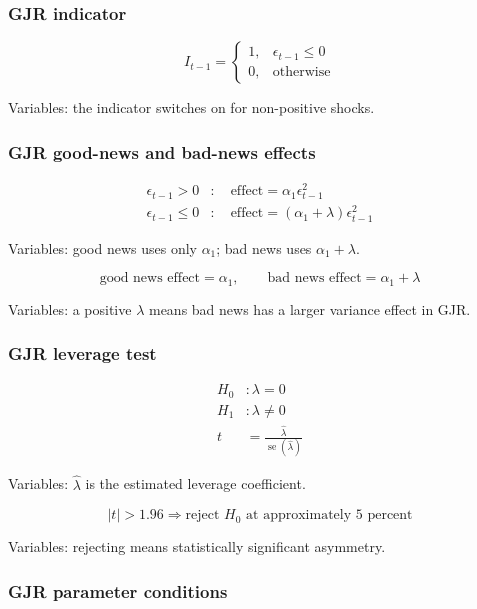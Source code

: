 \documentclass[
  8pt,
  twocolumn]{extarticle}
\begin{document}
\subsubsection{GJR indicator}\label{gjr-indicator}

\[
I_{t-1}=
\begin{cases}
1,&\epsilon_{t-1}\le0\\
0,&\text{otherwise}
\end{cases}
\]

Variables: the indicator switches on for non-positive shocks.

\subsubsection{GJR good-news and bad-news
effects}\label{gjr-good-news-and-bad-news-effects}

\[
\begin{aligned}
\epsilon_{t-1}>0&:\quad \text{effect}=\alpha_1\epsilon_{t-1}^2\\
\epsilon_{t-1}\le0&:\quad \text{effect}=(\alpha_1+\lambda)\epsilon_{t-1}^2
\end{aligned}
\]

Variables: good news uses only \(\alpha_1\); bad news uses
\(\alpha_1+\lambda\).

\[
\text{good news effect}=\alpha_1,\qquad \text{bad news effect}=\alpha_1+\lambda
\]

Variables: a positive \(\lambda\) means bad news has a larger variance
effect in GJR.

\subsubsection{GJR leverage test}\label{gjr-leverage-test}

\[
\begin{aligned}
H_0&:\lambda=0\\
H_1&:\lambda\ne0\\
t&=\frac{\hat\lambda}{\operatorname{se}(\hat\lambda)}
\end{aligned}
\]

Variables: \(\hat\lambda\) is the estimated leverage coefficient.

\[
|t|>1.96\Rightarrow \text{reject }H_0\text{ at approximately 5 percent}
\]

Variables: rejecting means statistically significant asymmetry.

\subsubsection{GJR parameter conditions}\label{gjr-parameter-conditions}
\end{document}
